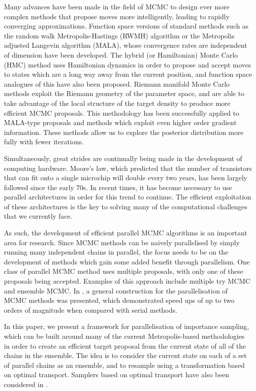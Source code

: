 \documentclass[final]{siamltex}
\begin{document}
Many advances have been made in the field of MCMC to design ever more
complex methods that propose moves more intelligently, leading to
rapidly converging approximations. Function space versions of standard methods
such as the random walk Metropolis-Hastings (RWMH) algorithm or the
Metropolis adjusted Langevin algorithm (MALA), whose convergence rates
are independent of dimension have been
developed\cite{cotter2013mcmc}. The hybrid (or Hamiltonian) Monte
Carlo (HMC) method uses Hamiltonian dynamics in order to propose and
accept moves to states which are a long way away from the current
position\cite{sexton1992hamiltonian}, and function space analogues of
this have also been proposed\cite{beskos2011hybrid}. Riemann
manifold Monte Carlo methods exploit the Riemann geometry of the
parameter space, and are able to take advantage of the local structure
of the target density to produce more efficient MCMC
proposals\cite{girolami2011riemann}. This methodology has been
successfully applied to MALA-type proposals and methods which exploit
even higher order gradient information\cite{bui2014solving}.  These
methods allow us to explore the posterior distribution more fully 
with fewer iterations.

Simultaneously, great strides are continually being made in the
development of computing hardware. Moore's law, which predicted that
the number of transistors that can fit onto a single microchip will
double every two years, has been largely followed since the early
70s\cite{moore1998cramming}. In recent times, it has become necessary
to use parallel architectures in order for this trend to continue. The efficient
exploitation of these architectures is the key to solving many of the
computational challenges that we currently face.

As such, the development of efficient parallel MCMC algorithms is an
important area for research. Since MCMC methods can be naively
parallelised by simply running many independent chains in parallel,
the focus needs to be on the development of methods which gain some
added benefit through parallelism. One class of parallel MCMC method
uses multiple proposals, with only one of these proposals being
accepted. Examples of this approach include multiple try
MCMC\cite{liu2000multiple} and ensemble MCMC\cite{neal2011mcmc}. In
\cite{calderhead2014general}, a general construction for the
parallelisation of MCMC methods was presented, which demonstrated
speed ups of up to two orders of magnitude when compared with serial methods.

In this paper, we present a framework for parallelisation of
importance sampling, which can be built around many of the current
Metropolis-based methodologies in order to create an efficient target
proposal from the current state of all of the chains in the
ensemble. The idea is to consider the current state on each of a set of
parallel chains as an ensemble, and to resample using a transformation
based on optimal transport. Samplers based on optimal transport
have also been considered in \cite{el2012bayesian}.
\end{document}
